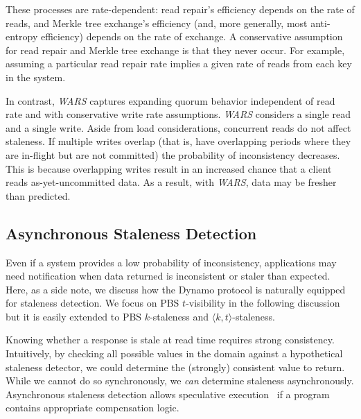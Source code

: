 \documentclass{vldb}
\newcommand{\subsectionskip}{-0em}
\begin{document}
These processes are rate-dependent: read repair's efficiency depends
on the rate of reads, and Merkle tree exchange's efficiency (and, more
generally, most anti-entropy efficiency) depends on the rate of
exchange.  A conservative assumption for read repair and Merkle tree
exchange is that they never occur. For example, assuming a particular
read repair rate implies a given rate of reads from each key in the
system.

In contrast, \textit{WARS} captures expanding quorum behavior
independent of read rate and with conservative write rate
assumptions. \textit{WARS} considers a single read and a single
write. Aside from load considerations, concurrent reads do not affect
staleness. If multiple writes overlap (that is, have overlapping
periods where they are in-flight but are not committed) the
probability of inconsistency decreases.  This is because overlapping
writes result in an increased chance that a client reads
as-yet-uncommitted data.  As a result, with \textit{WARS}, data may be
fresher than predicted.

\vspace{\subsectionskip}\subsection{Asynchronous Staleness Detection}

Even if a system provides a low probability of inconsistency,
applications may need notification when data returned is
inconsistent or staler than expected.  Here, as a side note, we
discuss how the Dynamo protocol is naturally equipped for staleness
detection.  We focus on PBS $t$-visibility in the following discussion
but it is easily extended to PBS $k$-staleness and $\langle k, t
\rangle$-staleness.

Knowing whether a response is stale at read time requires strong
consistency.  Intuitively, by checking all possible values in the domain against a
hypothetical staleness detector, we could determine the (strongly) consistent
value to return.  While we cannot do so synchronously, we \textit{can}
determine staleness asynchronously.  Asynchronous staleness detection
allows speculative execution~\cite{nsdispeculation} if a program
contains appropriate compensation logic.
\end{document}
